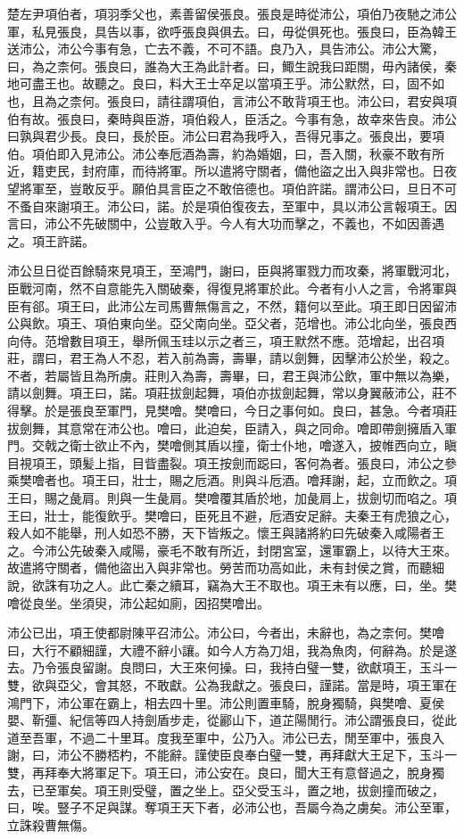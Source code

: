 楚左尹項伯者，項羽季父也，素善留侯張良。張良是時從沛公，項伯乃夜馳之沛公軍，私見張良，具告以事，欲呼張良與俱去。曰，毋從俱死也。張良曰，臣為韓王送沛公，沛公今事有急，亡去不義，不可不語。良乃入，具告沛公。沛公大驚，曰，為之柰何。張良曰，誰為大王為此計者。曰，鯫生說我曰距關，毋內諸侯，秦地可盡王也。故聽之。良曰，料大王士卒足以當項王乎。沛公默然，曰，固不如也，且為之柰何。張良曰，請往謂項伯，言沛公不敢背項王也。沛公曰，君安與項伯有故。張良曰，秦時與臣游，項伯殺人，臣活之。今事有急，故幸來告良。沛公曰孰與君少長。良曰，長於臣。沛公曰君為我呼入，吾得兄事之。張良出，要項伯。項伯即入見沛公。沛公奉卮酒為壽，約為婚姻，曰，吾入關，秋豪不敢有所近，籍吏民，封府庫，而待將軍。所以遣將守關者，備他盜之出入與非常也。日夜望將軍至，豈敢反乎。願伯具言臣之不敢倍德也。項伯許諾。謂沛公曰，旦日不可不蚤自來謝項王。沛公曰，諾。於是項伯復夜去，至軍中，具以沛公言報項王。因言曰，沛公不先破關中，公豈敢入乎。今人有大功而擊之，不義也，不如因善遇之。項王許諾。

沛公旦日從百餘騎來見項王，至鴻門，謝曰，臣與將軍戮力而攻秦，將軍戰河北，臣戰河南，然不自意能先入關破秦，得復見將軍於此。今者有小人之言，令將軍與臣有郤。項王曰，此沛公左司馬曹無傷言之，不然，籍何以至此。項王即日因留沛公與飲。項王、項伯東向坐。亞父南向坐。亞父者，范增也。沛公北向坐，張良西向侍。范增數目項王，舉所佩玉珪以示之者三，項王默然不應。范增起，出召項莊，謂曰，君王為人不忍，若入前為壽，壽畢，請以劍舞，因擊沛公於坐，殺之。不者，若屬皆且為所虜。莊則入為壽，壽畢，曰，君王與沛公飲，軍中無以為樂，請以劍舞。項王曰，諾。項莊拔劍起舞，項伯亦拔劍起舞，常以身翼蔽沛公，莊不得擊。於是張良至軍門，見樊噲。樊噲曰，今日之事何如。良曰，甚急。今者項莊拔劍舞，其意常在沛公也。噲曰，此迫矣，臣請入，與之同命。噲即帶劍擁盾入軍門。交戟之衛士欲止不內，樊噲側其盾以撞，衛士仆地，噲遂入，披帷西向立，瞋目視項王，頭髪上指，目眥盡裂。項王按劍而跽曰，客何為者。張良曰，沛公之參乘樊噲者也。項王曰，壯士，賜之卮酒。則與斗卮酒。噲拜謝，起，立而飲之。項王曰，賜之彘肩。則與一生彘肩。樊噲覆其盾於地，加彘肩上，拔劍切而啗之。項王曰，壯士，能復飲乎。樊噲曰，臣死且不避，卮酒安足辭。夫秦王有虎狼之心，殺人如不能舉，刑人如恐不勝，天下皆叛之。懷王與諸將約曰先破秦入咸陽者王之。今沛公先破秦入咸陽，豪毛不敢有所近，封閉宮室，還軍霸上，以待大王來。故遣將守關者，備他盜出入與非常也。勞苦而功高如此，未有封侯之賞，而聽細說，欲誅有功之人。此亡秦之續耳，竊為大王不取也。項王未有以應，曰，坐。樊噲從良坐。坐須臾，沛公起如廁，因招樊噲出。

沛公已出，項王使都尉陳平召沛公。沛公曰，今者出，未辭也，為之柰何。樊噲曰，大行不顧細謹，大禮不辭小讓。如今人方為刀俎，我為魚肉，何辭為。於是遂去。乃令張良留謝。良問曰，大王來何操。曰，我持白璧一雙，欲獻項王，玉斗一雙，欲與亞父，會其怒，不敢獻。公為我獻之。張良曰，謹諾。當是時，項王軍在鴻門下，沛公軍在霸上，相去四十里。沛公則置車騎，脫身獨騎，與樊噲、夏侯嬰、靳彊、紀信等四人持劍盾步走，從酈山下，道芷陽閒行。沛公謂張良曰，從此道至吾軍，不過二十里耳。度我至軍中，公乃入。沛公已去，閒至軍中，張良入謝，曰，沛公不勝桮杓，不能辭。謹使臣良奉白璧一雙，再拜獻大王足下，玉斗一雙，再拜奉大將軍足下。項王曰，沛公安在。良曰，聞大王有意督過之，脫身獨去，已至軍矣。項王則受璧，置之坐上。亞父受玉斗，置之地，拔劍撞而破之，曰，唉。豎子不足與謀。奪項王天下者，必沛公也，吾屬今為之虜矣。沛公至軍，立誅殺曹無傷。

